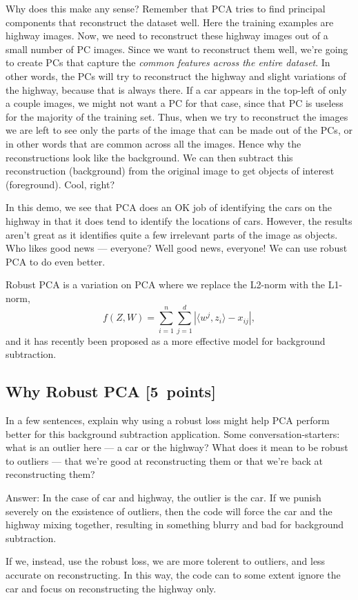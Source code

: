 \documentclass{article}
\newcommand{\blu}[1]{{\textcolor{blu}{#1}}}
\newenvironment{answer}{\par\begingroup\color{gre}Answer: }{\endgroup}
\let\ask\blu
\newcommand\pts[1]{\textcolor{pointscolour}{[#1~points]}}
\begin{document}
Why does this make any sense? Remember that PCA tries to find principal components that reconstruct the dataset well. Here the training examples are highway images. Now, we need to reconstruct these highway images out of a small number of PC images. Since we want to reconstruct them well, we're going to create PCs that capture the \emph{common features across the entire dataset}. In other words, the PCs will try to reconstruct the highway and slight variations of the highway, because that is always there. If a car appears in the top-left of only a couple images, we might not want a PC for that case, since that PC is useless for the majority of the training set. Thus, when we try to reconstruct the images we are left to see only the parts of the image that can be made out of the PCs, or in other words that are common across all the images. Hence why the reconstructions look like the background. We can then subtract this reconstruction (background) from the original image to get objects of interest (foreground). Cool, right?

In this demo, we see that PCA does an OK job of identifying the cars on the highway in that it does tend to identify the locations of cars. However, the results aren't great as it identifies quite a few irrelevant parts of the image as objects. Who likes good news --- everyone? Well good news, everyone! We can use robust PCA to do even better.

Robust PCA is a variation on PCA where we replace the L2-norm with the L1-norm,
\[
f(Z,W) = \sum_{i=1}^n\sum_{j=1}^d |\langle w^j, z_i\rangle - x_{ij}|,
\]
and it has recently been proposed as a more effective model for background subtraction.

\subsection{Why Robust PCA \pts{5}}

\ask{In a few sentences, explain why using a robust loss might help PCA perform better for this background subtraction application.} Some conversation-starters: what is an outlier here --- a car or the highway? What does it mean to be robust to outliers --- that we're good at reconstructing them or that we're back at reconstructing them?
\begin{answer}
	In the case of car and highway, the outlier is the car. If we punish severely on the exsistence of outliers, then the code will force the car and the highway mixing together, resulting in something blurry and bad for background subtraction.
	
	If we, instead, use the robust loss, we are more tolerent to outliers, and less accurate on reconstructing. In this way, the code can to some extent ignore the car and focus on reconstructing the highway only.
\end{answer}
\end{document}
